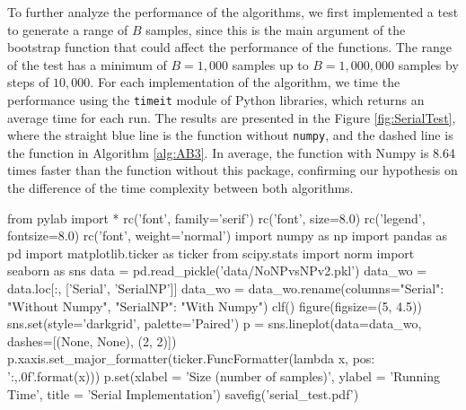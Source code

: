 \documentclass[11pt]{article}
\begin{document}
\medskip

To further analyze the performance of the algorithms, we first implemented a test to generate a range of $B$ samples, since
this is the main argument of the bootstrap function that could affect the performance of the functions. The range of the test
has a minimum of $B = 1,000$ samples up to $B = 1,000,000$ samples by steps of $10,000$. For each implementation of the
algorithm, we time the performance using the \texttt{timeit} module of Python libraries, which returns an average time for
each run. The results are presented in the Figure \ref{fig:SerialTest}, where the straight blue line is the function
without \texttt{numpy}, and the dashed line is the function in Algorithm \ref{alg:AB3}. In average, the function with Numpy
is 8.64 times faster than the function without this package, confirming our hypothesis on the difference of the time complexity
between both algorithms.

\medskip

\begin{pycode}
from pylab import *
rc('font', family='serif')
rc('font', size=8.0)
rc('legend', fontsize=8.0)
rc('font', weight='normal')
import numpy as np
import pandas as pd
import matplotlib.ticker as ticker
from scipy.stats import norm
import seaborn as sns
data = pd.read_pickle('data/NoNPvsNPv2.pkl')
data_wo = data.loc[:, ['Serial', 'SerialNP']]
data_wo = data_wo.rename(columns={"Serial": "Without Numpy", "SerialNP": "With Numpy"})
clf()
figure(figsize=(5, 4.5))
sns.set(style='darkgrid', palette='Paired')
p = sns.lineplot(data=data_wo, dashes=[(None, None), (2, 2)])
p.xaxis.set_major_formatter(ticker.FuncFormatter(lambda x, pos: '{:,.0f}'.format(x)))
p.set(xlabel = 'Size (number of samples)', ylabel = 'Running Time', title = 'Serial Implementation')
savefig('serial_test.pdf')
\end{pycode}
\end{document}
